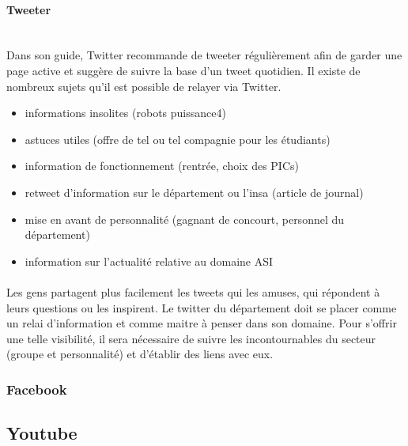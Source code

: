 \paragraph{Tweeter} ~~\\
Dans son guide, Twitter recommande de tweeter régulièrement afin de garder une page active et suggère de suivre la base d'un tweet quotidien.
Il existe de nombreux sujets qu'il est possible de relayer via Twitter.
\begin{itemize}
	\item informations insolites (robots puissance4)
	\item astuces utiles (offre de tel ou tel compagnie pour les étudiants)
	\item information de fonctionnement (rentrée, choix des PICs)
	\item retweet d'information sur le département ou l'insa (article de journal)
	\item mise en avant de personnalité (gagnant de concourt, personnel du département)
	\item information sur l'actualité relative au domaine ASI
\end{itemize}
\paragraph{}
 Les gens partagent plus facilement les tweets qui les amuses, qui répondent à leurs questions ou les inspirent. Le twitter du département doit se placer comme un relai d'information et comme maitre à penser dans son domaine. Pour s'offrir une telle visibilité, il sera nécessaire de suivre les incontournables du secteur (groupe et personnalité) et d'établir des liens avec eux.
\subsubsection{Facebook}
\subsection{Youtube}